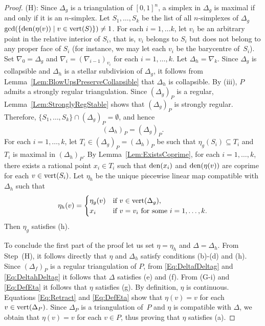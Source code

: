 \documentclass[reqno, draft]{amsart}
\theoremstyle{definition}
\begin{document}
\begin{proof}
 (H):
Since $\Delta_g$ is a triangulation of $[0,1]^n$,
 a simplex in $\Delta_g$ is maximal if and only if it is an $n$-simplex.
Let $S_1,\ldots,S_k$ be the list of all $n$-simplexes of 
$\Delta_g$ 
 $\gcd(\{\operatorname{{\rm den}}(\eta(v))\mid v\in\operatorname{{\rm vert}}(S)\})\neq 1$.  
For each $i=1,\ldots k$, 
let $v_i$ be an arbitrary point in the relative interior of $S_i$, 
that is, $v_i$ belongs to $S_i$ 
but  does not belong to any proper face of $S_i$ 
(for instance, we may let each $v_i$ be the barycentre of~$S_i$). 
Set $\nabla_0=\Delta_g$ and $\nabla_i=(\nabla_{i-1})_{v_i}$ 
for each $i=1,\ldots,k$. 
Let $\Delta_h=\nabla_k$. 
Since $\Delta_g$ is collapsible and $\Delta_h$ is a stellar 
subdivision of $\Delta_g$, 
it follows from Lemma~\ref{Lem:BlowUpsPreserveCollapsible} that 
$\Delta_h$ is collapsible.
 By (iii), $P$ admits a strongly regular triangulation.
Since $(\Delta_g)_P$ is a regular, 
Lemma~\ref{Lem:StronglyRegStable} shows that 
$(\Delta_g)_P$ is strongly regular. 
Therefore, $\{S_1,\ldots,S_k\}\cap(\Delta_g)_P=\emptyset$, 
and hence
\begin{equation}\label{Eq:DeltahDeltag}
  (\Delta_h)_P=(\Delta_g)_P.
\end{equation}
For each $i=1,\ldots,k$, 
let $T_i\in(\Delta_g)_P=(\Delta_h)_P$ be such that 
$\eta_g(S_i)\subseteq T_i$ and $T_i$ is maximal in $(\Delta_h)_P$. 
By Lemma~\ref{Lem:ExistsCoprime}, 
for each $i=1,\ldots,k$, there exists a rational point $x_i\in T_i$ such that $\operatorname{{\rm den}}(x_i)$ and $\operatorname{{\rm den}}(\eta(v))$ are coprime
for each $v\in\operatorname{{\rm vert}}(S_i)$.
Let $\eta_h$ be the unique piecewise linear  map compatible
 with $\Delta_h$ such that 
\begin{equation}\label{Eq:DefEta}
  \eta_h(v)=
\begin{cases}
   \eta_g(v)&\mbox{if } v\in\operatorname{{\rm vert}}(\Delta_g), \\ 
   x_i&\mbox{if }v=v_i\mbox{ for some } i=1,\ldots,k. 
\end{cases}
\end{equation}
Then $\eta_g$ satisfies (h).
\bigskip

To conclude the first part of the proof let us set 
 $\eta=\eta_h$ and $\Delta=\Delta_h$. 
From Step~(H),
 it follows directly that $\eta$ and $\Delta_h$
 satisfy conditions (b)-(d) and (h). 
Since $(\Delta_f)_P$ is a regular triangulation of $P$, 
from \eqref{Eq:DeltafDeltag} and \eqref{Eq:DeltahDeltag} 
it follows that $\Delta$ satisfies (e) and (f). 
From {(G-i)} and \eqref{Eq:DefEta} it follows that $\eta$ satisfies (g). 
By definition, $\eta$ is continuous. 
Equations \eqref{Eq:Retract} and \eqref{Eq:DefEta} show that 
$\eta(v)=v$ for each $v\in\operatorname{{\rm vert}}(\Delta_P)$. 
Since $\Delta_P$ is a triangulation of~$P$ 
and $\eta$ is compatible with $\Delta$, 
we obtain that  $\eta(v)=v$ for each $v\in P$, 
thus proving that $\eta$ satisfies (a). 


\end{proof}
\end{document}
